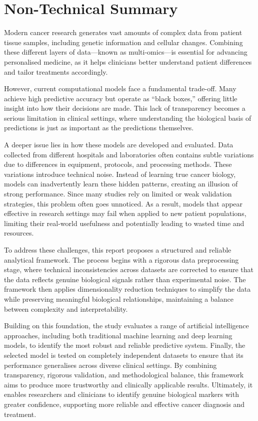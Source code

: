 \documentclass[conference]{IEEEtran}
\begin{document}
\section{Non-Technical Summary}
Modern cancer research generates vast amounts of complex data from patient tissue samples, including genetic information and cellular changes. Combining these different layers of data—known as multi-omics—is essential for advancing personalised medicine, as it helps clinicians better understand patient differences and tailor treatments accordingly.

However, current computational models face a fundamental trade-off. Many achieve high predictive accuracy but operate as “black boxes,” offering little insight into how their decisions are made. This lack of transparency becomes a serious limitation in clinical settings, where understanding the biological basis of predictions is just as important as the predictions themselves.

A deeper issue lies in how these models are developed and evaluated. Data collected from different hospitals and laboratories often contains subtle variations due to differences in equipment, protocols, and processing methods. These variations introduce technical noise. Instead of learning true cancer biology, models can inadvertently learn these hidden patterns, creating an illusion of strong performance. Since many studies rely on limited or weak validation strategies, this problem often goes unnoticed. As a result, models that appear effective in research settings may fail when applied to new patient populations, limiting their real-world usefulness and potentially leading to wasted time and resources.

To address these challenges, this report proposes a structured and reliable analytical framework. The process begins with a rigorous data preprocessing stage, where technical inconsistencies across datasets are corrected to ensure that the data reflects genuine biological signals rather than experimental noise. The framework then applies dimensionality reduction techniques to simplify the data while preserving meaningful biological relationships, maintaining a balance between complexity and interpretability.

Building on this foundation, the study evaluates a range of artificial intelligence approaches, including both traditional machine learning and deep learning models, to identify the most robust and reliable predictive system. Finally, the selected model is tested on completely independent datasets to ensure that its performance generalises across diverse clinical settings.
By combining transparency, rigorous validation, and methodological balance, this framework aims to produce more trustworthy and clinically applicable results. Ultimately, it enables researchers and clinicians to identify genuine biological markers with greater confidence, supporting more reliable and effective cancer diagnosis and treatment.



\end{document}
